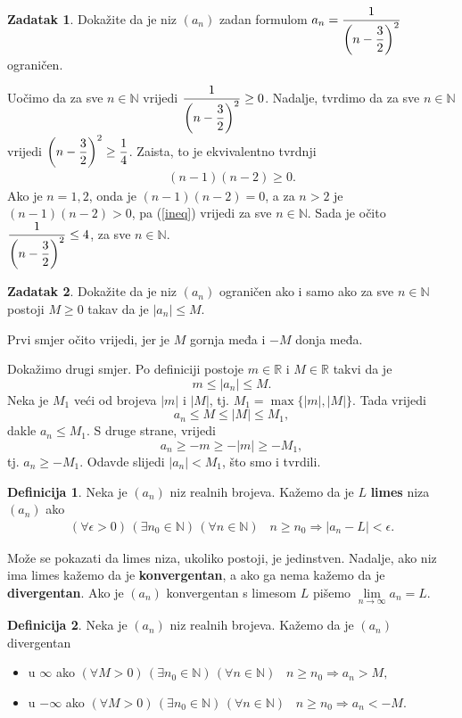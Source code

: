 \documentclass{book}
\let\originalleft\left
\let\originalright\right
\renewcommand{\left}{\mathopen{}\mathclose\bgroup\originalleft}
\renewcommand{\right}{\aftergroup\egroup\originalright}
\renewenvironment{proof}{%
    \vspace{-\parskip}\begin{oldproof}%
    }{%
    \end{oldproof}%
}
\theoremstyle{definition}
\theoremstyle{definition}
\newtheorem{definition}{Definicija}
\newtheorem{exercise}{Zadatak}
\theoremstyle{remark}
\begin{document}
\begin{exercise}
Dokažite da je niz $(a_n)$ zadan formulom $a_n=\dfrac{1}{\left(n-\dfrac{3}{2}\right)^2}$ ograničen.
\end{exercise}
\begin{proof}[Rješenje]
Uočimo da za sve $n\in \mathbb{N}$ vrijedi $\dfrac{1}{\left(n-\dfrac{3}{2}\right)^2}\geq 0$. Nadalje, tvrdimo da za sve $n\in \mathbb{N}$ vrijedi $\left(n-\dfrac{3}{2}\right)^2\geq \dfrac{1}{4}$. Zaista, to je ekvivalentno tvrdnji 
\begin{gather}
\label{ineq}
(n-1)(n-2)\geq 0.
\end{gather}
Ako je $n=1, 2$, onda je $(n-1)(n-2)=0$, a za $n>2$ je $(n-1)(n-2)>0$, pa (\ref{ineq}) vrijedi za sve $n\in \mathbb{N}$. Sada je očito $\dfrac{1}{\left(n-\dfrac{3}{2}\right)^2}\leq 4$, za sve $n\in \mathbb{N}$.
\end{proof}
\begin{exercise}
Dokažite da je niz $(a_n)$ ograničen ako i samo ako za sve $n\in \mathbb{N}$ postoji $M\geq 0$ takav da je $|a_n|\leq M$.
\end{exercise}
\begin{proof}[Rješenje]
Prvi smjer očito vrijedi, jer je $M$ gornja međa i $-M$ donja međa. 

Dokažimo drugi smjer. Po definiciji postoje $m\in \mathbb{R}$ i $M\in \mathbb{R}$ takvi da je $$m\leq |a_n|\leq M.$$ Neka je $M_1$ veći od brojeva $|m|$ i $|M|$, tj. $M_1=\max\{|m|, |M|\}$. Tada vrijedi $$a_n\leq M\leq |M|\leq M_1,$$
dakle $a_n\leq M_1$. S druge strane, vrijedi $$a_n\geq -m\geq -|m|\geq -M_1,$$ 
tj. $a_n\geq -M_1$. Odavde slijedi $|a_n|<M_1$, što smo i tvrdili.
\end{proof}

\begin{definition}
Neka je $(a_n)$ niz realnih brojeva. Kažemo da je $L$ \textbf{limes} niza $(a_n)$ ako
\begin{gather*}
(\forall \epsilon>0)\,(\exists n_0\in \mathbb{N})\, (\forall n\in \mathbb{N})\;\;\; n\geq n_0\Rightarrow |a_n-L|<\epsilon.
\end{gather*}
\end{definition}

Može se pokazati da limes niza, ukoliko postoji, je jedinstven. Nadalje, ako niz ima limes kažemo da je \textbf{konvergentan}, a ako ga nema kažemo da je \textbf{divergentan}. Ako je $(a_n)$ konvergentan s limesom $L$ pišemo $\lim\limits_{n\to \infty}{a_n}=L$.

\begin{definition}
Neka je $(a_n)$ niz realnih brojeva. Kažemo da je $(a_n)$ divergentan
\begin{itemize}
\item u $\mathbb{\infty}$ ako $(\forall M>0)\,(\exists n_0\in \mathbb{N})\,(\forall n\in \mathbb{N})\;\;\; n\geq n_0\Rightarrow a_n>M,$

\item u $-\mathbb{\infty}$ ako $(\forall M>0)\,(\exists n_0\in \mathbb{N})\,(\forall n\in \mathbb{N})\;\;\; n\geq n_0\Rightarrow a_n<-M.$
\end{itemize}
\end{definition}
\end{document}
